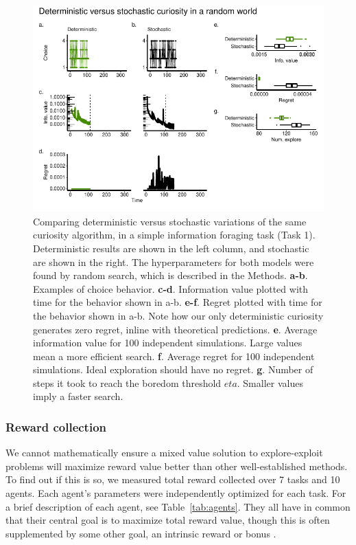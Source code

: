 \begin{figure}
	\includegraphics[width=1.0\linewidth]{img/curiosity1.pdf} 
	\caption{Comparing deterministic versus stochastic variations of the same curiosity algorithm, in a simple information foraging task (Task 1). Deterministic results are shown in the left column, and stochastic are shown in the right. The hyperparameters for both models were found by random search, which is described in the Methods.
	\textbf{a-b}. Examples of choice behavior.
	\textbf{c-d}. Information value plotted with time for the behavior shown in a-b.
	\textbf{e-f}. Regret plotted with time for the behavior shown in a-b. Note how our only deterministic curiosity generates zero regret, inline with theoretical predictions.
	\textbf{e}. Average information value for 100 independent simulations. Large values mean a more efficient search.
	\textbf{f}. Average regret for 100 independent simulations. Ideal exploration should have no regret. 
	\textbf{g}. Number of steps it took to reach the boredom threshold $eta$. Smaller values imply a faster search.
	}
	\label{fig:curiosity1} 
\end{figure}


\subsubsection*{Reward collection} 
We cannot mathematically ensure a mixed value solution to explore-exploit problems will maximize reward value better than other well-established methods. To find out if this is so, we measured total reward collected over 7 tasks and 10 agents. Each agent's parameters were independently optimized for each task. For a brief description of each agent, see Table~\ref{tab:agents}. They all have in common that their central goal is to maximize total reward value, though this is often supplemented by some other goal, an intrinsic reward or bonus \cite{Ng1999,Sutton1998}. 

